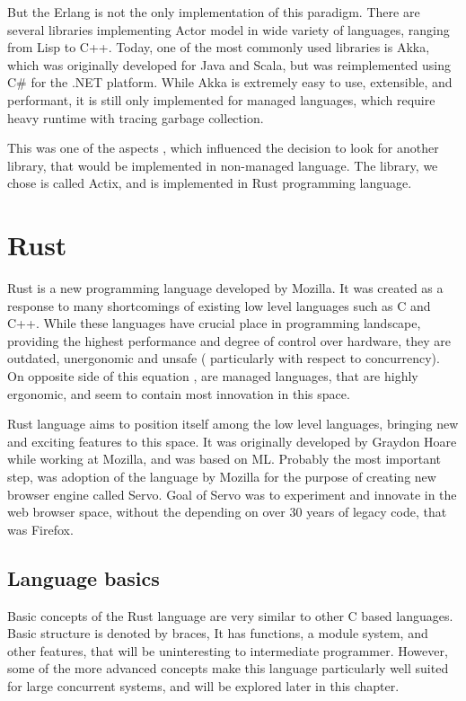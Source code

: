 But the Erlang is not the only implementation of this paradigm. There are several libraries implementing Actor model in
wide variety of languages, ranging from Lisp to C++. Today, one of the most commonly used libraries is Akka\cite{web:akka}, which was originally
developed for Java and Scala, but was reimplemented using C\# for the .NET platform. While Akka is extremely easy to use,
extensible, and performant, it is still only implemented for managed languages, which require heavy runtime with tracing garbage collection.

This was one of the aspects , which influenced the decision to look for another library, that would be implemented in
non-managed language. The library, we chose is called Actix\cite{web:actix}, and is implemented in Rust\cite{Blandy:2015:RPL:3019371}
programming language.

\section{Rust}
Rust is a new programming language developed by Mozilla. It was created as a response to many shortcomings of existing low level
languages such as C and C++. While these languages have crucial place in programming landscape, providing the highest performance and
degree of control over hardware, they are outdated, unergonomic and unsafe ( particularly with respect to concurrency). On opposite
side of this equation , are managed languages, that are highly ergonomic, and seem to contain most innovation in this space.

Rust language aims to position itself among the low level languages, bringing new and exciting features to this space.
It was originally developed by Graydon Hoare\cite{web:rust_progress} while working at Mozilla, and was based on
ML. Probably the most important step, was adoption of the language by Mozilla for the purpose of creating new browser engine
called Servo\cite{proc:servo}. Goal of Servo was to experiment and innovate in the web browser space, without
the depending on over 30 years of legacy code, that was Firefox.

\subsection{Language basics}
Basic concepts of the Rust language are very similar to other C based languages. Basic structure is denoted by braces,
It has functions, a module system, and other features, that will be uninteresting to intermediate programmer.
However, some of the more advanced concepts make this language particularly well suited for large concurrent systems, and
will be explored later in this chapter.

